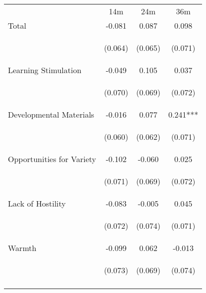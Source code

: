 \begin{tabular}{lccc}
\hline \noalign{\smallskip} & 14m & 24m & 36m\\
\noalign{\smallskip}\hline \noalign{\smallskip}Total & -0.081 & 0.087 & 0.098\\
 & \begin{footnotesize}(0.064)\end{footnotesize} & \begin{footnotesize}(0.065)\end{footnotesize} & \begin{footnotesize}(0.071)\end{footnotesize}\\
\noalign{\smallskip}Learning Stimulation & -0.049 & 0.105 & 0.037\\
 & \begin{footnotesize}(0.070)\end{footnotesize} & \begin{footnotesize}(0.069)\end{footnotesize} & \begin{footnotesize}(0.072)\end{footnotesize}\\
\noalign{\smallskip}Developmental Materials & -0.016 & 0.077 & 0.241***\\
 & \begin{footnotesize}(0.060)\end{footnotesize} & \begin{footnotesize}(0.062)\end{footnotesize} & \begin{footnotesize}(0.071)\end{footnotesize}\\
\noalign{\smallskip}Opportunities for Variety & -0.102 & -0.060 & 0.025\\
 & \begin{footnotesize}(0.071)\end{footnotesize} & \begin{footnotesize}(0.069)\end{footnotesize} & \begin{footnotesize}(0.072)\end{footnotesize}\\
\noalign{\smallskip}Lack of Hostility & -0.083 & -0.005 & 0.045\\
 & \begin{footnotesize}(0.072)\end{footnotesize} & \begin{footnotesize}(0.074)\end{footnotesize} & \begin{footnotesize}(0.071)\end{footnotesize}\\
\noalign{\smallskip}Warmth & -0.099 & 0.062 & -0.013\\
 & \begin{footnotesize}(0.073)\end{footnotesize} & \begin{footnotesize}(0.069)\end{footnotesize} & \begin{footnotesize}(0.074)\end{footnotesize}\\
\noalign{\smallskip}\hline\end{tabular}\\
